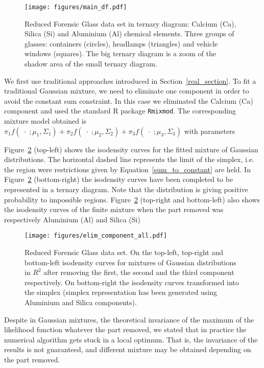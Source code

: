 \documentclass[12pt, a4paper]{article}
\begin{document}
\begin{figure}[htbp]
\centering
\texttt{[image: figures/main\_df.pdf]}%
\caption{Reduced Forensic Glass data set in ternary diagram: Calcium (Ca), Silica (Si) and Aluminium (Al) chemical elements. Three groups of glasses: containers (circles), headlamps (triangles) and vehicle windows (squares). The big ternary diagram is a zoom of the shadow area of the small ternary diagram.}
\label{fig04}
\end{figure}


We first use traditional approaches introduced in Section~\ref{real_section}. To fit a traditional Gaussian mixture, we need to eliminate one component in order to avoid the constant sum constraint. In this case we eliminated the Calcium (Ca) component and used the standard R package \texttt{Rmixmod}. The corresponding mixture model obtained is
$
\pi_1 f(\;\cdot\; ; \mu_1, \Sigma_1) + \pi_2 f(\;\cdot\; ; \mu_2, \Sigma_2) + \pi_3 f(\;\cdot\; ; \mu_3, \Sigma_3)
$
with parameters

{\small  }


Figure~\ref{fig05component_elimination} (top-left) shows the isodensity curves for the fitted mixture of Gaussian distributions. The horizontal dashed line represents the limit of the simplex, i.e. the region were restrictions given by Equation~\ref{sum_to_constant} are held. In Figure~\ref{fig05component_elimination} (bottom-right) the isodensity curves have been completed to be represented in a ternary diagram. Note that the distribution is giving positive probability to impossible regions. Figure~\ref{fig05component_elimination} (top-right and bottom-left) also shows the isodensity curves of the finite mixture when the part removed was respectively Aluminium (Al) and Silica (Si)

\begin{figure}[htbp]
\texttt{[image: figures/elim\_component\_all.pdf]}
\caption{Reduced Forensic Glass data set. On the top-left, top-right and bottom-left isodensity curves for mixtures of Gaussian distributions in $R^{2}$ after removing the first, the second and the third component respectively. On bottom-right the isodensity curves transformed into the simplex (simplex representation has been generated using Aluminium and Silica components).}
\label{fig05component_elimination}
\end{figure}

Despite in Gaussian mixtures, the theoretical invariance of the maximum of the likelihood function whatever the part removed, we stated that in practice the numerical algorithm gets stuck in a local optimum. That is, the invariance of the results is not guaranteed, and different mixture may be obtained depending on the part removed. 
\end{document}
